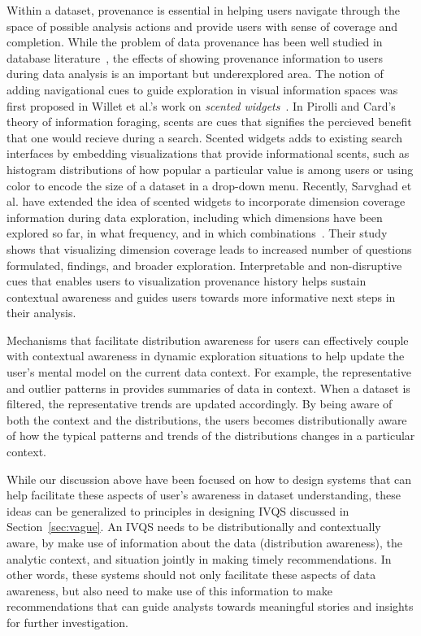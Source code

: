 \par Within a dataset, provenance is essential in helping users navigate through the space of possible analysis actions and provide users with sense of coverage and completion. While the problem of data provenance has been well studied in database literature~\cite{Buneman2006,Cui2003,Woodruff1997}, the effects of showing provenance information to users during data analysis is an important but underexplored area. The notion of adding navigational cues to guide exploration in visual information spaces was first proposed in Willet et al.'s work on \textit{scented widgets}~\cite{Willett2007}. In Pirolli and Card's theory of information foraging, scents are cues that signifies the percieved benefit that one would recieve during a search. Scented widgets adds to existing search interfaces by embedding visualizations that provide informational scents, such as histogram distributions of how popular a particular value is among users or using color to encode the size of a dataset in a drop-down menu. Recently, Sarvghad et al. have extended the idea of scented widgets to incorporate dimension coverage information during data exploration, including which dimensions have been explored so far, in what frequency, and in which combinations~\cite{Sarvghad2017}. Their study shows that visualizing dimension coverage leads to increased number of questions formulated, findings, and broader exploration. Interpretable and non-disruptive cues that enables users to visualization provenance history helps sustain contextual awareness and guides users towards more informative next steps in their analysis.%
\par Mechanisms that facilitate distribution awareness for users can effectively couple with contextual awareness in dynamic exploration situations to help update the user's mental model on the current data context. For example, the representative and outlier patterns in \zv provides summaries of data in context. When a dataset is filtered, the representative trends are updated accordingly. By being aware of both the context and the distributions, the users becomes distributionally aware of how the typical patterns and trends of the distributions changes in a particular context. %
\par While our discussion above have been focused on how to design systems that can help facilitate these aspects of user's awareness in dataset understanding, these ideas can be generalized to principles in designing IVQS discussed in Section~\ref{sec:vague}. An IVQS needs to be distributionally and contextually aware, by make use of information about the data (distribution awareness), the analytic context, and situation jointly in making timely recommendations. In other words, these systems should not only facilitate these aspects of data awareness, but also need to make use of this information to make recommendations that can guide analysts towards meaningful stories and insights for further investigation.
